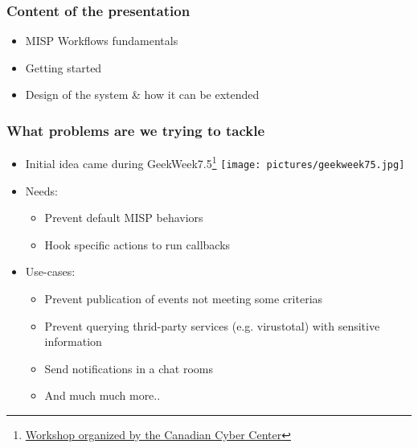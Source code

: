 
\begin{frame}[t,plain]
\titlepage
\end{frame}

\begin{frame}
    \frametitle{Content of the presentation}
    \begin{itemize}
        \item MISP Workflows fundamentals
        \item Getting started
        \item Design of the system \& how it can be extended
    \end{itemize}

    \begin{center}
    \end{center}
\end{frame}

\begin{frame}
    \frametitle{What problems are we trying to tackle}
    \begin{itemize}
        \item Initial idea came during GeekWeek7.5\footnote{\href{https://cyber.gc.ca/en/events/geekweek-75}{Workshop organized by the Canadian Cyber Center}} \texttt{[image: pictures/geekweek75.jpg]}
        \item Needs:
        \begin{itemize}
            \item Prevent default MISP behaviors
            \item Hook specific actions to run callbacks
        \end{itemize}
        \item Use-cases:
        \begin{itemize}
            \item Prevent publication of events not meeting some criterias
            \item Prevent querying thrid-party services (e.g. virustotal) with sensitive information
            \item Send notifications in a chat rooms
            \item And much much more..
        \end{itemize}
    \end{itemize}
\end{frame}

